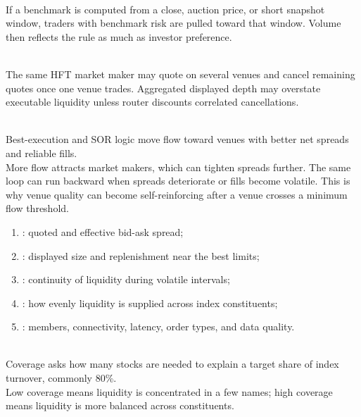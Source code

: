 \begin{caveat} \\
If a benchmark is computed from a close, auction price, or short snapshot window, traders with benchmark risk are pulled toward that window. Volume then reflects the rule as much as investor preference.
\end{caveat}

\begin{caveat} \\
The same HFT market maker may quote on several venues and cancel remaining quotes once one venue trades. Aggregated displayed depth may overstate executable liquidity unless router discounts correlated cancellations.
\end{caveat}

\begin{mechanism} \\
Best-execution and SOR logic move flow toward venues with better net spreads and reliable fills.\\
More flow attracts market makers, which can tighten spreads further. The same loop can run backward when spreads deteriorate or fills become volatile. This is why venue quality can become self-reinforcing after a venue crosses a minimum flow threshold.
\end{mechanism}

\begin{taxonomy} 
\begin{enumerate}[label=\roman*.]
\setlength{\itemsep}{0pt}
\item {}: quoted and effective bid-ask spread;
\item {}: displayed size and replenishment near the best limits;
\item {}: continuity of liquidity during volatile intervals;
\item {}: how evenly liquidity is supplied across index constituents;
\item {}: members, connectivity, latency, order types, and data quality.
\end{enumerate}
\end{taxonomy}

\begin{definition} \\
Coverage asks how many stocks are needed to explain a target share of index turnover, commonly 80\%.\\
Low coverage means liquidity is concentrated in a few names; high coverage means liquidity is more balanced across constituents.
\end{definition}


